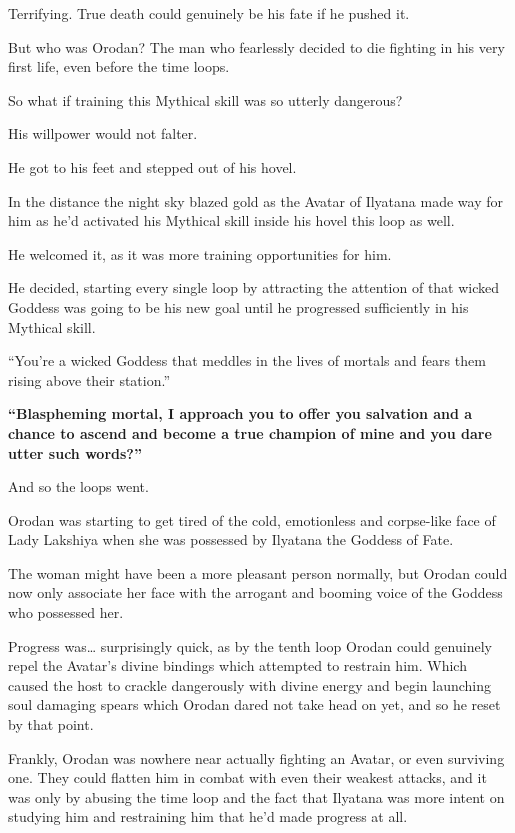 \documentclass[a4paper,10pt]{book}
\begin{document}
Terrifying. True death could genuinely be his fate if he pushed it.\par
But who was Orodan? The man who fearlessly decided to die fighting in his very first life, even before the time loops.\par
So what if training this Mythical skill was so utterly dangerous?\par
His willpower would not falter.\par
He got to his feet and stepped out of his hovel.\par
In the distance the night sky blazed gold as the Avatar of Ilyatana made way for him as he’d activated his Mythical skill inside his hovel this loop as well.\par
He welcomed it, as it was more training opportunities for him.\par
He decided, starting every single loop by attracting the attention of that wicked Goddess was going to be his new goal until he progressed sufficiently in his Mythical skill.\par
\par
“You’re a wicked Goddess that meddles in the lives of mortals and fears them rising above their station.”\par
\textbf{“Blaspheming mortal, I approach you to offer you salvation and a chance to ascend and become a true champion of mine and you dare utter such words?”}\par
And so the loops went.\par
Orodan was starting to get tired of the cold, emotionless and corpse-like face of Lady Lakshiya when she was possessed by Ilyatana the Goddess of Fate.\par
The woman might have been a more pleasant person normally, but Orodan could now only associate her face with the arrogant and booming voice of the Goddess who possessed her.\par
Progress was… surprisingly quick, as by the tenth loop Orodan could genuinely repel the Avatar’s divine bindings which attempted to restrain him. Which caused the host to crackle dangerously with divine energy and begin launching soul damaging spears which Orodan dared not take head on yet, and so he reset by that point.\par
Frankly, Orodan was nowhere near actually fighting an Avatar, or even surviving one. They could flatten him in combat with even their weakest attacks, and it was only by abusing the time loop and the fact that Ilyatana was more intent on studying him and restraining him that he’d made progress at all.\par
\end{document}
